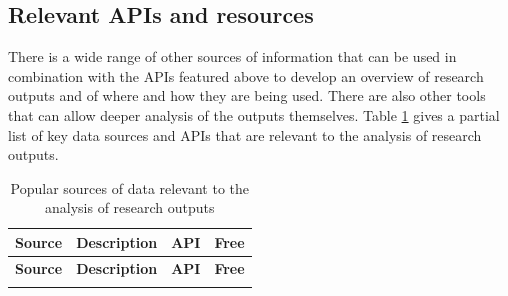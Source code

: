 \documentclass[]{krantz}
\begin{document}
\subsection{Relevant APIs and resources}\label{sec:4-3.1}

There is a wide range of other sources of information that can be used
in combination with the APIs featured above to develop an overview of
research outputs and of where and how they are being used. There are
also other tools that can allow deeper analysis of the outputs
themselves. Table \ref{tab:table2-1} gives a partial list of key data
sources and APIs that are relevant to the analysis of research outputs.

\begin{longtable}[]{@{}llcc@{}}
\caption{\label{tab:table2-1} Popular sources of data relevant to the
analysis of research outputs}\tabularnewline
\toprule
\begin{minipage}[b]{0.10\columnwidth}\raggedright\strut
\textbf{Source}\strut
\end{minipage} & \begin{minipage}[b]{0.74\columnwidth}\raggedright\strut
\textbf{Description}\strut
\end{minipage} & \begin{minipage}[b]{0.02\columnwidth}\centering\strut
\textbf{API}\strut
\end{minipage} & \begin{minipage}[b]{0.02\columnwidth}\centering\strut
\textbf{Free}\strut
\end{minipage}\tabularnewline
\midrule
\endfirsthead
\toprule
\begin{minipage}[b]{0.10\columnwidth}\raggedright\strut
\textbf{Source}\strut
\end{minipage} & \begin{minipage}[b]{0.74\columnwidth}\raggedright\strut
\textbf{Description}\strut
\end{minipage} & \begin{minipage}[b]{0.02\columnwidth}\centering\strut
\textbf{API}\strut
\end{minipage} & \begin{minipage}[b]{0.02\columnwidth}\centering\strut
\textbf{Free}\strut
\end{minipage}\tabularnewline
\midrule
\endhead
\begin{minipage}[t]{0.10\columnwidth}\raggedright\strut
\strut
\end{minipage} & \begin{minipage}[t]{0.74\columnwidth}\raggedright\strut

\end{minipage}
\end{longtable}
\end{document}
